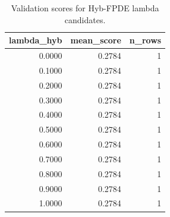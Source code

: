\begin{table}[t]
\caption{Validation scores for Hyb-FPDE lambda candidates.}
\label{tab:lambda_distribution_computed}
\centering
\begin{tabular}{rrr}
\toprule
lambda\_hyb & mean\_score & n\_rows \\
\midrule
0.0000 & 0.2784 & 1 \\
0.1000 & 0.2784 & 1 \\
0.2000 & 0.2784 & 1 \\
0.3000 & 0.2784 & 1 \\
0.4000 & 0.2784 & 1 \\
0.5000 & 0.2784 & 1 \\
0.6000 & 0.2784 & 1 \\
0.7000 & 0.2784 & 1 \\
0.8000 & 0.2784 & 1 \\
0.9000 & 0.2784 & 1 \\
1.0000 & 0.2784 & 1 \\
\bottomrule
\end{tabular}

\end{table}
